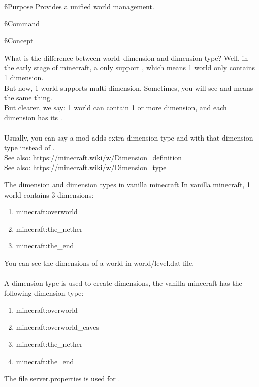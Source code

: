 
\ss{Purpose}
Provides a unified world management.

\ss{Command}

\ss{Concept}

\begin{example}{What is the difference between world\tcomma\ dimension and dimension type?}
    Well, in the early stage of minecraft, a  only support , which means 1 world only contains 1 dimension.\\
    But now, 1 world supports multi dimension.
    Sometimes, you will see  and  means the same thing.\\
    But clearer, we say: 1 world can contain 1 or more dimension, and each dimension has its .\\\\
    Usually, you can say a mod adds extra dimension type and  with that dimension type instead of .\\
    See also: \url{https://minecraft.wiki/w/Dimension_definition}\\
    See also: \url{https://minecraft.wiki/w/Dimension_type}
\end{example}

\begin{tips}{The dimension and dimension types in vanilla minecraft}
    In vanilla minecraft, 1 world contains 3 dimensions:
    \begin{enumerate}
        \item minecraft:overworld
        \item minecraft:the\_nether
        \item minecraft:the\_end
    \end{enumerate}
    You can see the dimensions of a world in world/level.dat file.
    \\\\
    A dimension type is used to create dimensions, the vanilla minecraft has the following dimension type:
    \begin{enumerate}
        \item minecraft:overworld
        \item minecraft:overworld\_caves
        \item minecraft:the\_nether
        \item minecraft:the\_end
    \end{enumerate}

    The file server.properties is used for .
\end{tips}

